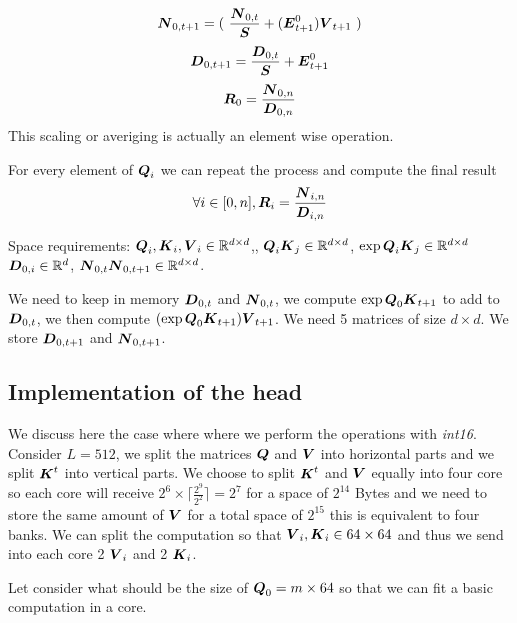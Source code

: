 \documentclass[conference]{IEEEtran}
\begin{document}
\begin{equation}
  \label{eq:sum0}
  \Vc{N}_{0,t+1} =(\
  \frac{\Vc{N}_{0,t}}{\Vc{S}}  + (\Vc{E}_{t+1}^0)\Vc{V}_{t+1}\
  )
\end{equation}
\begin{equation}
    \label{eq:sum1}
  {\Vc{D}_{0,t+1}} = {\frac{\Vc{D}_{0,t}}{\Vc{S}} +\Vc{E}_{t+1}^0}
\end{equation}
\begin{equation}
  \label{eq:res}
  \Vc{R}_0 = \frac{\Vc{N}_{0,n}}{\Vc{D}_{0,n}}
\end{equation}
This scaling or averiging is actually an element wise operation.

For every element of ${\boldsymbol Q}_i$ we can repeat the process and compute the final result
\begin{equation}
  \label{eq:resall}
 \forall i \in [0,n],\/ \Vc{R}_i = \frac{\Vc{N}_{i,n}}{\Vc{D}_{i,n}}
\end{equation}



Space requirements: ${\boldsymbol Q}_i, {\boldsymbol K}_i, {\boldsymbol V}_i \in \mathbb{R}^{d \times
  d}$,, ${\boldsymbol Q}_i{\boldsymbol K}_j \in \mathbb{R}^{d\times d}$, $\exp{\boldsymbol Q}_i{\boldsymbol K}_j
\in \mathbb{R}^{d\times d}$ ${\boldsymbol D}_{0,i} \in \mathbb{R}^{d}$,
${\boldsymbol N}_{0,t}{\boldsymbol N}_{0,t+1} \in \mathbb{R}^{d \times d}$.

We need to keep in memory ${\boldsymbol D}_{0,t}$ and ${\boldsymbol N}_{0,t}$, we
compute $\exp{{\boldsymbol Q}_0{\boldsymbol K}_{t+1}}$ to add to ${\boldsymbol D}_{0,t}$, we then
compute $(\exp{{\boldsymbol Q}_0{\boldsymbol K}_{t+1}}){\boldsymbol V}_{t+1}$. We need 5 matrices
of size $d \times d$. We store  ${\boldsymbol D}_{0,t+1}$ and ${\boldsymbol N}_{0,t+1}$.


\subsection{Implementation of the head}

We discuss here the case where where we perform the operations with
{\em int16}. Consider $L=512$, we split the matrices ${\boldsymbol Q}$ and
${\boldsymbol V}$ into horizontal parts and we split ${\boldsymbol K}^t$ into vertical
parts. We choose to split ${\boldsymbol K}^t$ and ${\boldsymbol V}$ equally into four
core so each core will receive $2^6\times
\lceil\frac{2^9}{2^2}\rceil=2^7$ for a space of $2^{14}$ Bytes and we
need to store the same amount of ${\boldsymbol V}$ for a total space of
$2^{15}$ this is equivalent to four banks. We can split the
computation so that ${\boldsymbol V}_i, {\boldsymbol K}_i \in 64\times 64$ and thus we
send into each core 2 ${\boldsymbol V}_i$ and 2 ${\boldsymbol K}_i$.

Let consider what should be the size of ${\boldsymbol Q}_0 = m \times 64$ so
that we can fit a basic computation in a core.
\end{document}
